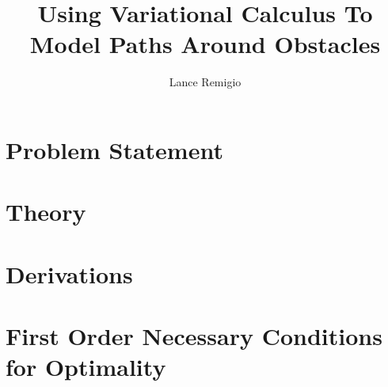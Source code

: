 \documentclass[a4paper]{report}
\title{Using Variational Calculus To Model Paths Around Obstacles}
\author{Lance Remigio}
\begin{document}
\maketitle

\chapter{Problem Statement}



\chapter{Theory}



\chapter{Derivations}



\chapter{First Order Necessary Conditions for Optimality}


\end{document}
